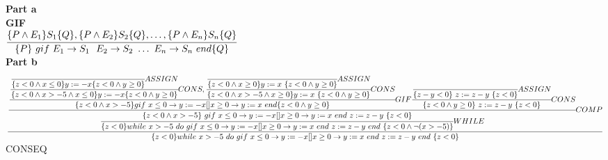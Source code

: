 \documentclass{article}
\newcommand{\s}{\text{ }}
\begin{document}
\noindent
\textbf{Part a}\\
\textbf{GIF}\\
    $\cfrac{\{P \wedge E_1\} S_1 \{Q\},\{P \wedge E_2\} S_2 \{Q\},\dots,\{P \wedge E_n\} S_n \{Q\}}{\{P\}\s gif\s E_1 \rightarrow S_1\s\s E_2 \rightarrow S_2\s \dots \s E_n\rightarrow S_n\s end\{Q\}}$ \\

\noindent
\textbf{Part b}\\
\hspace{20cm}
$\cfrac{\cfrac{\cfrac{\cfrac{\cfrac{}{\{z < 0 \wedge x \leq 0\} y:=-x \{z<0 \wedge y \geq 0\}}ASSIGN}{\{z < 0 \wedge x > -5 \wedge x \leq 0\} y:=-x \{z<0 \wedge y \geq 0\}}CONS,\cfrac{\cfrac{}{\{z < 0 \wedge x \geq 0\}  y:=x \s\{z < 0 \wedge y\geq 0\}}ASSIGN}{\{z < 0 \wedge x > -5 \wedge x \geq 0\}  y:=x \s\{z < 0 \wedge y\geq 0\}}CONS}{\{z < 0 \wedge x > -5\} gif \s x \leq 0 \rightarrow y:=-x [] x \geq 0 \rightarrow  y:=x \s end  \{z < 0 \wedge y\geq 0\}}GIF\cfrac{\cfrac{}{\{z - y < 0\}\s z:= z-y \s \{z<0\}}ASSIGN}{\{z < 0 \wedge y\geq 0\}\s z:= z-y \s \{z<0\}}CONS}{\cfrac{\{z < 0 \wedge x > -5\} \s gif \s x \leq 0 \rightarrow y:=-x [] x \geq 0 \rightarrow  y:=x \s end  \s z:= z-y \s \{z<0\}}{\{z < 0\} while\s x > -5 \s do \s gif \s x \leq 0 \rightarrow y:=-x [] x \geq 0 \rightarrow  y:=x \s end  \s z:= z-y \s end \s \{z < 0 \wedge \neg(x > -5)\}}WHILE}COMP}{\{z < 0\} while\s x > -5 \s do \s gif \s x \leq 0 \rightarrow y:=-x [] x \geq 0 \rightarrow  y:=x \s end  \s z:= z-y \s end \s \{z < 0\}}$CONSEQ
\end{document}
